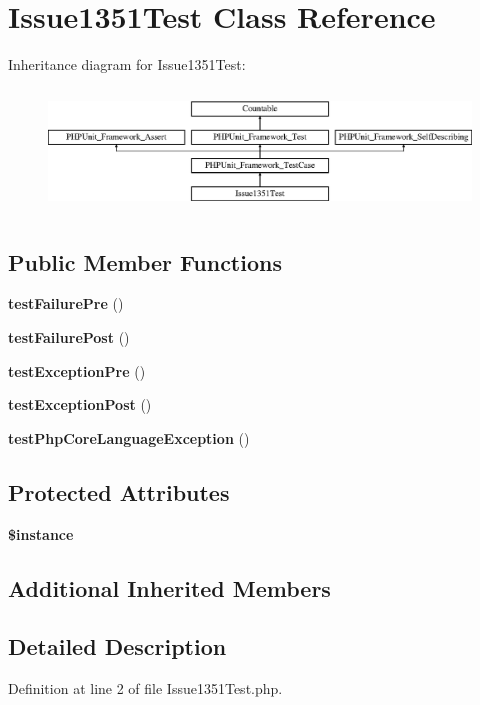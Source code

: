 \section{Issue1351\+Test Class Reference}
\label{class_issue1351_test}
Inheritance diagram for Issue1351\+Test\+:\begin{figure}[H]
\begin{center}
\leavevmode
\includegraphics[height=3.303835cm]{class_issue1351_test}
\end{center}
\end{figure}
\subsection*{Public Member Functions}
\begin{DoxyCompactItemize}
\item 
{\bf test\+Failure\+Pre} ()
\item 
{\bf test\+Failure\+Post} ()
\item 
{\bf test\+Exception\+Pre} ()
\item 
{\bf test\+Exception\+Post} ()
\item 
{\bf test\+Php\+Core\+Language\+Exception} ()
\end{DoxyCompactItemize}
\subsection*{Protected Attributes}
\begin{DoxyCompactItemize}
\item 
{\bf \$instance}
\end{DoxyCompactItemize}
\subsection*{Additional Inherited Members}


\subsection{Detailed Description}


Definition at line 2 of file Issue1351\+Test.\+php.



